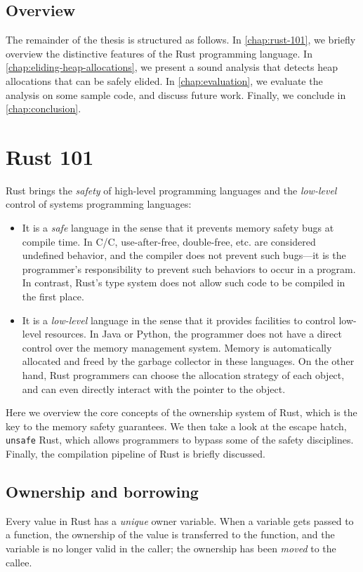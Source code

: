 \documentclass[en]{snu-ece-bsc-thesis}
\theoremstyle{definition}
\def\cplus{\raisebox{.4ex}{\relsize{-3}{\texttt{+}}}}
\def\C++{C\nolinebreak\hspace{-.081em}\cplus\nolinebreak\hspace{-0.02em}\cplus}
\begin{document}
\section{Overview}
The remainder of the thesis is structured as follows.
In \autoref{chap:rust-101}, we briefly overview the distinctive features of the Rust programming language.
In \autoref{chap:eliding-heap-allocations}, we present a sound analysis that detects heap allocations that can be safely elided.
In \autoref{chap:evaluation}, we evaluate the analysis on some sample code, and discuss future work.
Finally, we conclude in \autoref{chap:conclusion}.



\chapter{Rust 101}\label{chap:rust-101}
Rust brings the \emph{safety} of high-level programming languages and the \emph{low-level} control of systems programming languages:
\begin{itemize}
  \item It is a \emph{safe} language in the sense that it prevents memory safety bugs at compile time.
    In C/\C++{}, use-after-free, double-free, etc. are considered undefined behavior, and the compiler does not prevent such bugs---it is the programmer's responsibility to prevent such behaviors to occur in a program.
    In contrast, Rust's type system does not allow such code to be compiled in the first place.

  \item It is a \emph{low-level} language in the sense that it provides facilities to control low-level resources.
    In Java or Python, the programmer does not have a direct control over the memory management system.
    Memory is automatically allocated and freed by the garbage collector in these languages.
    On the other hand, Rust programmers can choose the allocation strategy of each object, and can even directly interact with the pointer to the object.
\end{itemize}

Here we overview the core concepts of the ownership system of Rust, which is the key to the memory safety guarantees.
We then take a look at the escape hatch, \verb/unsafe/ Rust, which allows programmers to bypass some of the safety disciplines.
Finally, the compilation pipeline of Rust is briefly discussed.

\section{Ownership and borrowing}
Every value in Rust has a \emph{unique} owner variable.
When a variable gets passed to a function, the ownership of the value is transferred to the function, and the variable is no longer valid in the caller; the ownership has been \emph{moved} to the callee.
\end{document}
